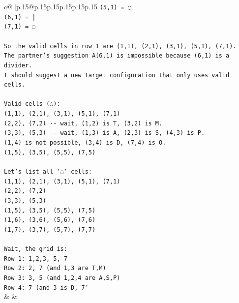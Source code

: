 \documentclass{article}
\begin{document}
{\begin{supertabular}{c@{$\;$}|p{.15\linewidth}@{}p{.15\linewidth}p{.15\linewidth}p{.15\linewidth}p{.15\linewidth}p{.15\linewidth}}
{{{\texttt{(5,1) = ◌} \\
\texttt{(6,1) = │} \\
\texttt{(7,1) = ◌} \\
\\ 
\texttt{So the valid cells in row 1 are (1,1), (2,1), (3,1), (5,1), (7,1).} \\
\texttt{The partner's suggestion A(6,1) is impossible because (6,1) is a divider.} \\
\texttt{I should suggest a new target configuration that only uses valid cells.} \\
\\ 
\texttt{Valid cells (◌):} \\
\texttt{(1,1), (2,1), (3,1), (5,1), (7,1)} \\
\texttt{(2,2), (7,2) {-}{-} wait, (1,2) is T, (3,2) is M.} \\
\texttt{(3,3), (5,3) {-}{-} wait, (1,3) is A, (2,3) is S, (4,3) is P.} \\
\texttt{(1,4) is not possible, (3,4) is D, (7,4) is O.} \\
\texttt{(1,5), (3,5), (5,5), (7,5)} \\
\\ 
\texttt{Let's list all '◌' cells:} \\
\texttt{(1,1), (2,1), (3,1), (5,1), (7,1)} \\
\texttt{(2,2), (7,2)} \\
\texttt{(3,3), (5,3)} \\
\texttt{(1,5), (3,5), (5,5), (7,5)} \\
\texttt{(1,6), (3,6), (5,6), (7,6)} \\
\texttt{(1,7), (3,7), (5,7), (7,7)} \\
\\ 
\texttt{Wait, the grid is:} \\
\texttt{Row 1: 1,2,3, 5, 7} \\
\texttt{Row 2: 2, 7 (and 1,3 are T,M)} \\
\texttt{Row 3: 3, 5 (and 1,2,4 are A,S,P)} \\
\texttt{Row 4: 7 (and 3 is D, 7'} \\
            }
        }
    }
    & & \\ \\


\end{supertabular}}
\end{document}
